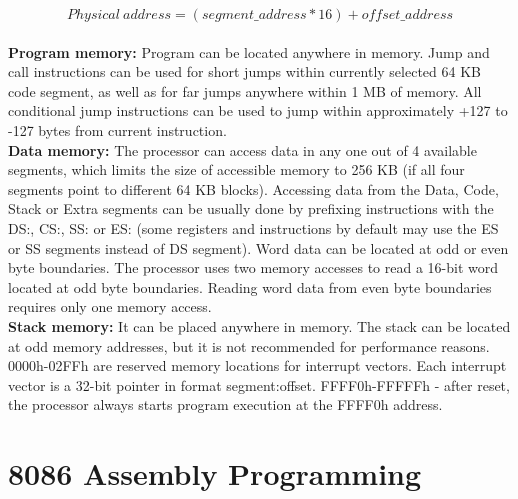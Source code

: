 \documentclass[12pt, a4paper]{scrartcl}
\begin{document}
	$$ Physical\ address = (segment\_address * 16) + offset\_address $$\\
	
	\textbf{Program memory: }Program can be located anywhere in memory. Jump and call instructions can be used for short
	jumps within currently selected 64 KB code segment, as
	well as for far jumps anywhere within 1 MB of memory. All conditional jump instructions can be used to jump
	within approximately +127 to -127 bytes from current
	instruction. \\
	
	\textbf{Data memory: }The processor can access data in any one
	out of 4 available segments, which limits the size of
	accessible memory to 256 KB (if all four segments point to
	different 64 KB blocks). Accessing data from the Data, Code, Stack or Extra segments can be usually done by prefixing instructions
	with the DS:, CS:, SS: or ES: (some registers and instructions by default may use the ES or SS segments instead of DS segment). Word data can be located at odd or even byte boundaries.	The processor uses two memory accesses to read a 16-bit	word located at odd byte boundaries. Reading word data from even byte boundaries requires only one memory	access. \\
	
	\textbf{Stack memory: }It can be placed anywhere in memory. The
	stack can be located at odd memory addresses, but it is not
	recommended for performance reasons. \\
	
	0000h-02FFh are reserved memory locations for interrupt vectors. Each interrupt vector is a 32-bit pointer in format segment:offset. FFFF0h-FFFFFh - after reset, the processor always starts program execution at the FFFF0h address.


\section{8086 Assembly Programming}
\end{document}
